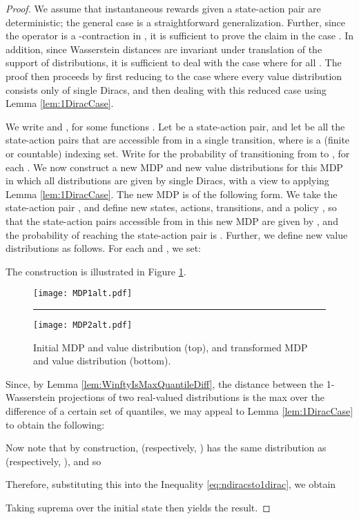 \documentclass[letterpaper]{article}
\begin{document}
\begin{proof}
We assume that instantaneous rewards given a state-action pair are deterministic; the general case is a straightforward generalization. Further, since the operator  is a -contraction in , it is sufficient to prove the claim in the case . In addition, since Wasserstein distances are invariant under translation of the support of distributions, it is sufficient to deal with the case where  for all . The proof then proceeds by first reducing to the case where every value distribution consists only of single Diracs, and then dealing with this reduced case using Lemma \ref{lem:1DiracCase}.

We write  and , for some functions . Let  be a state-action pair, and let  be all the state-action pairs that are accessible from  in a single transition, where  is a (finite or countable) indexing set. Write  for the probability of transitioning from  to , for each . We now construct a new MDP and new value distributions for this MDP in which all distributions are given by single Diracs, with a view to applying Lemma \ref{lem:1DiracCase}. The new MDP is of the following form. We take the state-action pair , and define new states, actions, transitions, and a policy , so that the state-action pairs accessible from  in this new MDP are given by , and the probability of reaching the state-action pair  is . Further, we define new value distributions  as follows. For each  and , we set:

The construction is illustrated in Figure \ref{fig:TransformedMDP}.
\begin{figure}
    \centering
    \texttt{[image: MDP1alt.pdf]}
    \vspace{0.25cm}
    \rule{0.47\textwidth}{0.4pt}


    \texttt{[image: MDP2alt.pdf]}
    \caption{Initial MDP and value distribution  (top), and transformed MDP and value distribution  (bottom).}
    \label{fig:TransformedMDP}
\end{figure}

Since, by Lemma \ref{lem:WinftyIsMaxQuantileDiff}, the  distance between the 1-Wasserstein projections of two real-valued distributions is the max over the difference of a certain set of quantiles, we may appeal to Lemma \ref{lem:1DiracCase} to obtain the following:


Now note that by construction,  (respectively, ) has the same distribution as  (respectively, ), and so

Therefore, substituting this into the Inequality \ref{eq:ndiracsto1dirac}, we obtain

Taking suprema over the initial state  then yields the result.
\end{proof}
\end{document}
